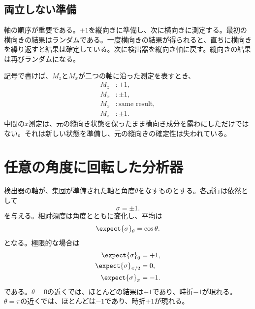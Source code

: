 \subsection{両立しない準備}

軸の順序が重要である。\(+1\)を縦向きに準備し、次に横向きに測定する。最初の横向きの結果はランダムである。一度横向きの結果が得られると、直ちに横向きを繰り返すと結果は確定している。次に検出器を縦向き軸に戻す。縦向きの結果は再びランダムになる。

記号で書けば、\(M_z\)と\(M_x\)が二つの軸に沿った測定を表すとき、
\begin{equation}
\begin{aligned}
  M_z&:+1,\\
  M_x&:\pm1,\\
  M_x&:\text{same result},\\
  M_z&:\pm1.
\end{aligned}
\end{equation}
中間の\(x\)測定は、元の縦向き状態を保ったまま横向き成分を露わにしただけではない。それは新しい状態を準備し、元の縦向きの確定性は失われている。

\begin{classroomqa}
\end{classroomqa}

\begin{classroomqa}
\end{classroomqa}

\section{任意の角度に回転した分析器}

検出器の軸が、集団が準備された軸と角度\(\theta\)をなすものとする。各試行は依然として
\begin{equation}
  \sigma=\pm1.
\end{equation}
を与える。相対頻度は角度とともに変化し、平均は
\begin{equation}
  \expect{\sigma}_{\theta}=\cos\theta.
  \label{eq:qml1-cosine-mean}
\end{equation}
となる。極限的な場合は
\begin{align}
  \expect{\sigma}_{0}&=+1,\\
  \expect{\sigma}_{\pi/2}&=0,\\
  \expect{\sigma}_{\pi}&=-1.
\end{align}
である。\(\theta=0\)の近くでは、ほとんどの結果は\(+1\)であり、時折\(-1\)が現れる。\(\theta=\pi\)の近くでは、ほとんどは\(-1\)であり、時折\(+1\)が現れる。


